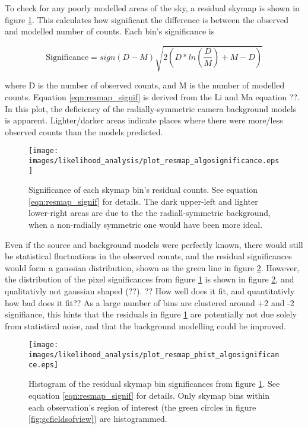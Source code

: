   To check for any poorly modelled areas of the sky, a residual skymap is shown in figure \ref{fig:gc_resmap}.
  This calculates how significant the difference is between the observed and modelled number of counts.
  Each bin's significance is 
  
  \begin{equation}
    \label{eqn:resmap_signif}
    \text{Significance} = sign(D-M) \sqrt{ 2 \left ( D * ln \left ( \frac{D}{M} \right ) + M - D \right ) }
  \end{equation}
  
  where D is the number of observed counts, and M is the number of modelled counts.
  Equation \ref{eqn:resmap_signif} is derived from the Li and Ma {\color{red}equation ??}. 
  In this plot, the deficiency of the radially-symmetric camera background models is apparent.
  Lighter/darker areas indicate places where there were more/less observed counts than the models predicted.
  
  \begin{figure}[ht]
    \centering
    \texttt{[image: images/likelihood\_analysis/plot\_resmap\_algosignificance.eps]}
    \caption[Galactic Center Residual Map]
    {
      Significance of each skymap bin's residual counts.
      See equation \ref{eqn:resmap_signif} for details.
      The dark upper-left and lighter lower-right areas are due to the the radiall-symmetric background, when a non-radially symmetric one would have been more ideal.
    }
    \label{fig:gc_resmap}
  \end{figure}

  Even if the source and background models were perfectly known, there would still be statistical fluctuations in the observed counts, and the residual significances would form a gaussian distribution, shown as the green line in figure \ref{fig:gc_resmap_sighist}.
  However, the distribution of the pixel significances from figure \ref{fig:gc_resmap} is shown in figure \ref{fig:gc_resmap_sighist}, and qualitativly not gaussian shaped {\color{red}(??)}.
  {\color{red}?? How well does it fit, and quantitativly how bad does it fit??}
  As a large number of bins are clustered around +2 and -2 signifiance, this hints that the residuals in figure \ref{fig:gc_resmap} are potentially not due solely from statistical noise, and that the background modelling could be improved.
  
  \begin{figure}[ht]
    \centering
    \texttt{[image: images/likelihood\_analysis/plot\_resmap\_phist\_algosignificance.eps]}
    \caption[Galactic Center Residual Histogram]
    {
      Histogram of the residual skymap bin significances from figure \ref{fig:gc_resmap}.
      See equation \ref{eqn:resmap_signif} for details.
      Only skymap bins within each observation's region of interest (the green circles in figure \ref{fig:gcfieldsofview}) are histogrammed.
    }
    \label{fig:gc_resmap_sighist}
  \end{figure}
  
